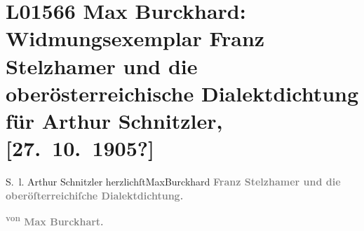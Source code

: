 

\section[Max Burckhard: Widmungsexemplar Franz Stelzhamer und die oberösterreichische Dialektdichtung für Arthur Schnitzler, {[}27. 10. 1905?{]}]{L01566 Max Burckhard: Widmungsexemplar Franz Stelzhamer und die
               oberösterreichische Dialektdichtung für Arthur Schnitzler, {[}27. 10. 1905?{]}}
\nopagebreak{}
\rehead{ }\normalsize\beginnumbering{}
\toendnotes[C]{\smallbreak\pagebreak[2]}
\toendnotes[C]{\smallbreak}
\pstart
           \noindent{}{\pb}S. l. Arthur Schnitzler\pend
           \pstart herzlichſt\spacefill\mbox{MaxBurckhard}\pend{}\vspace{1em}{\vspace{1\baselineskip}}
\pstart
           \centering{}{\pb}\textcolor{gray}{\textbf{Franz Stelzhamer und die oberöſterreichiſche
                     Dialektdichtung.}}\pend
           
\pstart
           \centering{}\textcolor{gray}{\textbf{\textsuperscript{von} Max Burckhart.}}\pend
           
